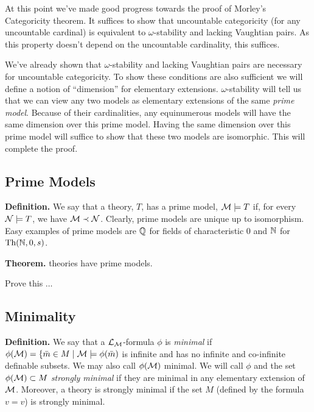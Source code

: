 At this point we've made good progress towards the proof of Morley's Categoricity theorem.
It suffices to show that uncountable categoricity (for any uncountable cardinal) is equivalent to \(\omega\)-stability and lacking Vaughtian pairs.
As this property doesn't depend on the uncountable cardinality, this suffices. 

We've already shown that \(\omega\)-stability and lacking Vaughtian pairs are necessary for uncountable categoricity.
To show these conditions are also sufficient we will define a notion of ``dimension'' for elementary extensions.
\(\omega\)-stability will tell us that we can view any two models as elementary extensions of the same \textit{prime model}.
Because of their cardinalities, any equinumerous models will have the same dimension over this prime model.
Having the same dimension over this prime model will suffice to show that these two models are isomorphic.
This will complete the proof. 

\subsection{Prime Models}

\textbf{Definition.} We say that a theory, \(T\),  has a prime model, \(\mathcal{M} \models T\) if, for every \(\mathcal{N} \models T\), we have \(\mathcal{M} \prec \mathcal{N}\). 
Clearly, prime models are unique up to isomorphism. Easy examples of prime models are \(\mathbb{Q}\) for fields of characteristic 0 and \(\mathbb{N}\) for \(\text{Th}(\mathbb{N}, 0, s)\). 

\textbf{Theorem.} \omst theories have prime models.
 
{\color{red}Prove this \(\ldots\)}

\subsection{Minimality}

\textbf{Definition.} We say that a \(\mathcal{L}_{\mathcal{M}}\)-formula \(\phi\) is \textit{minimal} if \(\phi(\mathcal{M}) = \{\bar{m} \in M \mid \mathcal{M} \models \phi(\bar{m})\) is infinite and has no infinite and co-infinite definable subsets. 
We may also call \(\phi(\mathcal{M})\) minimal. 
We will call \(\phi\) and the set \(\phi(\mathcal{M}) \subset M\) %
\textit{strongly minimal} if they are minimal in any elementary extension of \(\mathcal{M}\).
Moreover, a theory is strongly minimal if the set \(M\) (defined by the formula \(v = v\)) is strongly minimal. 

